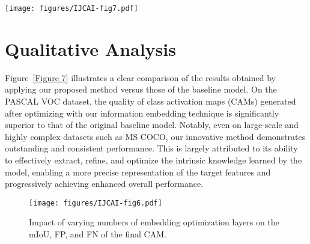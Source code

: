     \begin{figure*}[t] 
    \centering
    \texttt{[image: figures/IJCAI-fig7.pdf]}
    \caption{
    Visualization of the CAMs of input images generated by different methods. (a)(e) Input; (b)(f) Baseline; (c)(g) Dual Optimization of Embedding Information (DOEI); (d)(h) GT;
    }
    \label{Figure 7} 
    \end{figure*}

\section{Qualitative Analysis}

    Figure~\ref{Figure 7} illustrates a clear comparison of the results obtained by applying our proposed method versus those of the baseline model. On the PASCAL VOC dataset, the quality of class activation maps (CAMs) generated after optimizing with our information embedding technique is significantly superior to that of the original baseline model. Notably, even on large-scale and highly complex datasets such as MS COCO, our innovative method demonstrates outstanding and consistent performance. This is largely attributed to its ability to effectively extract, refine, and optimize the intrinsic knowledge learned by the model, enabling a more precise representation of the target features and progressively achieving enhanced overall performance.

    \begin{figure}[t]
    \centering
    \texttt{[image: figures/IJCAI-fig6.pdf]}  
    \caption{Impact of varying numbers of embedding optimization layers on the mIoU, FP, and FN of the final CAM.}
    \label{Figure 6}
    \end{figure}
    





